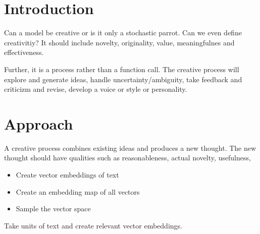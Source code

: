 \documentclass[twocolumn]{article}
\begin{document}


\section{Introduction}
Can a model be creative or is it only a stochastic parrot.   Can we even define creativitiy?   It should include novelty, originality, value, meaningfulnes and effectiveness.

Further, it is a process rather than a function call.  The creative process will explore and generate ideas, handle uncertainty/ambiguity, take feedback and criticizm and revise, develop
a voice or style or personality. 

\section{Approach}
A creative process combines existing ideas and produces a new thought.  The new thought should have qualities such as reasonableness, actual novelty, usefulness, 
\begin{itemize}
\item Create vector embeddings of text
\item Create an embedding map of all vectors
\item Sample the vector space 
\end{itemize}
Take units of text and create relevant vector embeddings.
\end{document}
